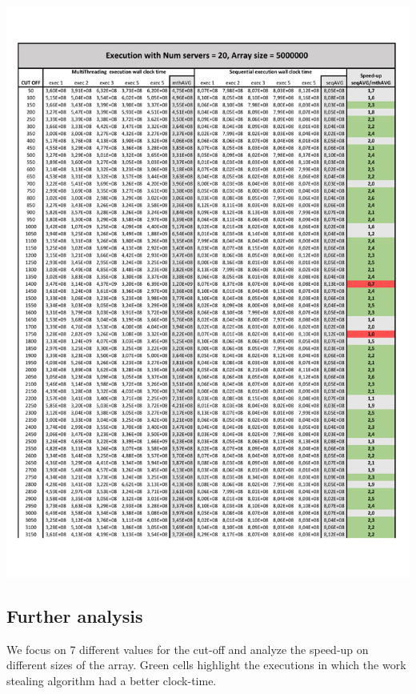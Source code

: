 \documentclass{article}
\begin{document}
\clearpage
\centering
\includegraphics[page=2, width=0.9\linewidth]{imgs/CutOffAnalysis02.pdf}%
\endgroup

\clearpage 

\subsection{Further analysis}\label{CO2}
We focus on 7 different values for the cut-off and analyze the speed-up on different sizes of the array. Green cells highlight the executions in which the work stealing algorithm had a better clock-time.
\end{document}

